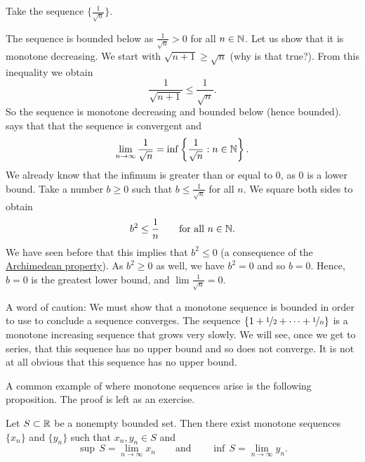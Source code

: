\begin{example}
Take the sequence $\bigl\{ \frac{1}{\sqrt{n}} \bigr\}$.

The sequence is
bounded below as
$\frac{1}{\sqrt{n}} > 0$ for all $n \in {\mathbb{N}}$.
Let us show that it is monotone decreasing.  We start with
$\sqrt{n+1} \geq \sqrt{n}$ (why is that true?).  From this inequality
we obtain
\begin{equation*}
\frac{1}{\sqrt{n+1}} \leq \frac{1}{\sqrt{n}} .
\end{equation*}
So the sequence is monotone decreasing and bounded below (hence
bounded).   says that that the sequence is
convergent and
\begin{equation*}
\lim_{n\to \infty} \frac{1}{\sqrt{n}}
=
\inf \left\{ \frac{1}{\sqrt{n}} : n \in {\mathbb{N}} \right\} .
\end{equation*}
We already know that the infimum is greater than or equal to 0, as
0 is a lower bound.  Take a number $b \geq 0$ such
that $b \leq \frac{1}{\sqrt{n}}$ for all $n$.  We square both sides to
obtain
\begin{equation*}
b^2 \leq \frac{1}{n} \qquad \text{for all } n \in {\mathbb{N}}.
\end{equation*}
We have seen before that this implies that $b^2 \leq 0$ (a consequence
of the \hyperref[thm:arch:i]{Archimedean property}).  As $b^2 \geq 0$ as
well, we have $b^2 = 0$
and so $b = 0$.
Hence, $b=0$ is the greatest lower bound, and $\lim \frac{1}{\sqrt{n}} = 0$.
\end{example}

\begin{example}
A word of caution:  We must show that a monotone sequence is bounded
in order to use  to conclude a sequence converges.
The sequence $\{ 1 + \nicefrac{1}{2} + \cdots + \nicefrac{1}{n} \}$
is a monotone increasing
sequence that grows very slowly.  We will see, once we get to series,
that this sequence has no upper bound and so does not converge.  It is not
at all obvious that this sequence has no upper bound.
\end{example}

A common example of where monotone sequences arise is the following
proposition.  The proof is left as an exercise.

\begin{prop} \label{prop:supinfseq}
Let $S \subset {\mathbb{R}}$ be a nonempty bounded set.
Then there exist monotone sequences
$\{ x_n \}$ and $\{ y_n \}$ such that $x_n, y_n \in S$ and
\begin{equation*}
\sup\,S = \lim_{n\to \infty} x_n \qquad \text{and} \qquad \inf\,S =
\lim_{n\to\infty} y_n .
\end{equation*}
\end{prop}

